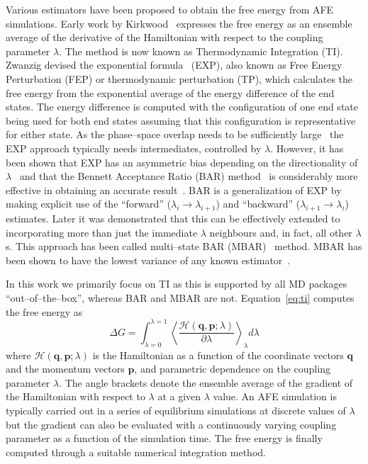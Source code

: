 \documentclass[journal=jctcce,manuscript=article]{achemso}
\renewcommand{\vec}[1]{\mathbf{#1}}
\begin{document}
Various estimators have been proposed to obtain the free energy from AFE 
simulations.  Early work by Kirkwood~\cite{kirkwood_statistical_1935} expresses 
the free energy as an ensemble average of the derivative of the
Hamiltonian with respect to the coupling parameter $\lambda$.  The
method is now known as Thermodynamic Integration (TI).  Zwanzig
devised the exponential formula~\cite{zwanzig_high-temperature_1954}
(EXP), also known as Free Energy Perturbation (FEP) or thermodynamic
perturbation (TP), which calculates the free energy from the
exponential average of the energy difference of the end states.  The
energy difference is computed with the configuration of one end state
being used for both end states assuming that this configuration is
representative for either state.  As the phase--space overlap needs to
be sufficiently large~\cite{wu_phase-space_2005,
  wu_phase-space_2005-1} the EXP approach typically needs
intermediates, controlled by $\lambda$.  However, it has been shown
that EXP has an asymmetric bias depending on the directionality of
$\lambda$~\cite{wu_asymmetric_2004} and that the Bennett Acceptance
Ratio (BAR) method~\cite{bennett_efficient_1976} is considerably more
effective in obtaining an accurate result~\cite{lu_appropriate_2003}.
BAR is a generalization of EXP by making explicit use of the
``forward'' ($\lambda_i \rightarrow \lambda_{i+1}$) and ``backward''
($\lambda_{i+1} \rightarrow \lambda_i$) estimates.  Later it was
demonstrated that this can be effectively extended to incorporating
more than just the immediate $\lambda$ neighbours and, in fact, all
other $\lambda$s.  This approach has been called multi--state BAR
(MBAR)~\cite{shirts_statistically_2008-1} method.  MBAR has been shown
to have the lowest variance of any known
estimator~\cite{shirts_statistically_2008}.

In this work we primarily focus on TI as this is supported by all MD
packages ``out--of--the--box'', whereas BAR and MBAR are not.
Equation~\ref{eq:ti} computes the free energy as
\begin{equation}\label{eq:ti}
	\Delta G = \int_{\lambda=0}^{\lambda=1}
	\left\langle \frac{\mathscr{H}(\vec{q},\vec{p};\lambda)}{\partial\lambda}\right\rangle_\lambda d\lambda
\end{equation}
where $\mathscr{H}(\vec{q},\vec{p};\lambda)$ is the Hamiltonian as a function of the coordinate vectors $\vec{q}$ and the momentum vectors $\vec{p}$, and parametric dependence on the coupling parameter $\lambda$.  The angle brackets denote the ensemble average of the gradient of the Hamiltonian with respect to $\lambda$ at a given $\lambda$ value.  An AFE simulation is typically carried out in a series of equilibrium simulations at discrete values of $\lambda$ but the gradient can also be evaluated with a continuously varying coupling parameter as a function of the simulation time.  The free energy is finally computed through a suitable numerical integration method.
\end{document}
